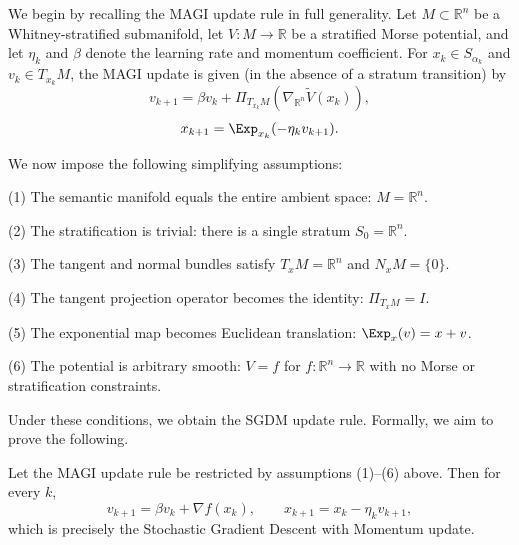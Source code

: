 \documentclass[12pt]{article}
\begin{document}
We begin by recalling the MAGI update rule in full generality. Let $M \subset \mathbb{R}^n$ be a Whitney-stratified submanifold, let $V : M \to \mathbb{R}$ be a stratified Morse potential, and let $\eta_k$ and $\beta$ denote the learning rate and momentum coefficient. For $x_k \in S_{\alpha_k}$ and $v_k \in T_{x_k}M$, the MAGI update is given (in the absence of a stratum transition) by
\[
v_{k+1}
=
\beta v_k
+
\Pi_{T_{x_k}M}(\nabla_{\mathbb{R}^n}\widetilde{V}(x_k)),
\]
\[
x_{k+1}
=
\Exp_{x_k}(-\eta_k v_{k+1}).
\]

We now impose the following simplifying assumptions:

(1) The semantic manifold equals the entire ambient space: $M = \mathbb{R}^n$.

(2) The stratification is trivial: there is a single stratum $S_0 = \mathbb{R}^n$.

(3) The tangent and normal bundles satisfy $T_xM = \mathbb{R}^n$ and $N_xM = \{0\}$.

(4) The tangent projection operator becomes the identity: $\Pi_{T_xM} = I$.

(5) The exponential map becomes Euclidean translation: $\Exp_x(v) = x + v$.

(6) The potential is arbitrary smooth: $V = f$ for $f : \mathbb{R}^n \to \mathbb{R}$ with no Morse or stratification constraints.

Under these conditions, we obtain the SGDM update rule. Formally, we aim to prove the following.

\begin{theorem}
Let the MAGI update rule be restricted by assumptions (1)--(6) above. Then for every $k$,
\[
v_{k+1}
=
\beta v_k + \nabla f(x_k),
\qquad
x_{k+1}
=
x_k - \eta_k v_{k+1},
\]
which is precisely the Stochastic Gradient Descent with Momentum update.
\end{theorem}
\end{document}
